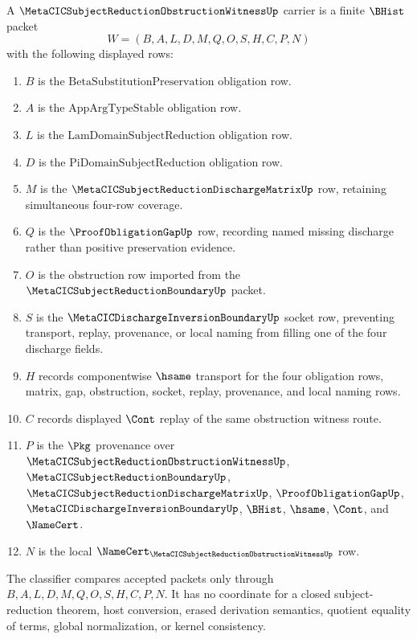 \begin{definition}
\label{def:metacic-subject-reduction-obstruction-witness-carrier}
A $\MetaCICSubjectReductionObstructionWitnessUp$ carrier is a finite $\BHist$ packet
$$
W=(B,A,L,D,M,Q,O,S,H,C,P,N)
$$
with the following displayed rows:
\begin{enumerate}
\item $B$ is the $\mathrm{BetaSubstitutionPreservation}$ obligation row.
\item $A$ is the $\mathrm{AppArgTypeStable}$ obligation row.
\item $L$ is the $\mathrm{LamDomainSubjectReduction}$ obligation row.
\item $D$ is the $\mathrm{PiDomainSubjectReduction}$ obligation row.
\item $M$ is the $\MetaCICSubjectReductionDischargeMatrixUp$ row, retaining simultaneous four-row coverage.
\item $Q$ is the $\ProofObligationGapUp$ row, recording named missing discharge rather than positive preservation evidence.
\item $O$ is the obstruction row imported from the $\MetaCICSubjectReductionBoundaryUp$ packet.
\item $S$ is the $\MetaCICDischargeInversionBoundaryUp$ socket row, preventing transport, replay, provenance, or local naming from filling one of the four discharge fields.
\item $H$ records componentwise $\hsame$ transport for the four obligation rows, matrix, gap, obstruction, socket, replay, provenance, and local naming rows.
\item $C$ records displayed $\Cont$ replay of the same obstruction witness route.
\item $P$ is the $\Pkg$ provenance over $\MetaCICSubjectReductionObstructionWitnessUp$, $\MetaCICSubjectReductionBoundaryUp$, $\MetaCICSubjectReductionDischargeMatrixUp$, $\ProofObligationGapUp$, $\MetaCICDischargeInversionBoundaryUp$, $\BHist$, $\hsame$, $\Cont$, and $\NameCert$.
\item $N$ is the local $\NameCert_{\MetaCICSubjectReductionObstructionWitnessUp}$ row.
\end{enumerate}
The classifier compares accepted packets only through $B,A,L,D,M,Q,O,S,H,C,P,N$. It has no coordinate for a closed subject-reduction theorem, host conversion, erased derivation semantics, quotient equality of terms, global normalization, or kernel consistency.
\end{definition}

